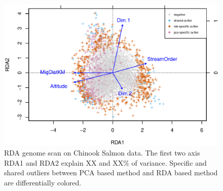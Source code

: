 \documentclass[12pt]{article}
\begin{document}
\begin{figure}[t]
\begin{center}
\includegraphics[height=0.6\textheight]{figures/salmon_rda.eps}
\end{center}
\caption{RDA genome scan on Chinook Salmon data. The first two axis RDA1 and RDA2 explain XX and XX\% of variance. Specific and shared outliers between PCA based method and RDA based method are differentially colored.}%
\label{fig:simulatedenvir}%
\end{figure}
\end{document}
